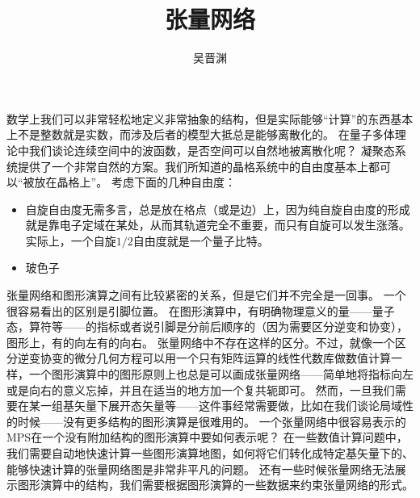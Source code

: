 \documentclass[hyperref, UTF8, a4paper]{ctexart}
\title{张量网络}
\author{吴晋渊}
\begin{document}
\maketitle

数学上我们可以非常轻松地定义非常抽象的结构，但是实际能够“计算”的东西基本上不是整数就是实数，而涉及后者的模型大抵总是能够离散化的。
在量子多体理论中我们谈论连续空间中的波函数，是否空间可以自然地被离散化呢？
凝聚态系统提供了一个非常自然的方案。我们所知道的晶格系统中的自由度基本上都可以“被放在晶格上”。
考虑下面的几种自由度：
\begin{itemize}
    \item 自旋自由度无需多言，总是放在格点（或是边）上，因为纯自旋自由度的形成就是靠电子定域在某处，从而其轨道完全不重要，而只有自旋可以发生涨落。
    实际上，一个自旋$1/2$自由度就是一个量子比特。
    \item 玻色子
\end{itemize}



张量网络和图形演算之间有比较紧密的关系，但是它们并不完全是一回事。
一个很容易看出的区别是引脚位置。
在图形演算中，有明确物理意义的量——量子态，算符等——的指标或者说引脚是分前后顺序的（因为需要区分逆变和协变），图形上，有的向左有的向右。
张量网络中不存在这样的区分。不过，就像一个区分逆变协变的微分几何方程可以用一个只有矩阵运算的线性代数库做数值计算一样，一个图形演算中的图形原则上也总是可以画成张量网络——简单地将指标向左或是向右的意义忘掉，并且在适当的地方加一个复共轭即可。
然而，一旦我们需要在某一组基矢量下展开态矢量等——这件事经常需要做，比如在我们谈论局域性的时候——没有更多结构的图形演算是很难用的。
一个张量网络中很容易表示的MPS在一个没有附加结构的图形演算中要如何表示呢？
在一些数值计算问题中，我们需要自动地快速计算一些图形演算地图，如何将它们转化成特定基矢量下的、能够快速计算的张量网络图是非常非平凡的问题。
还有一些时候张量网络无法展示图形演算中的结构，我们需要根据图形演算的一些数据来约束张量网络的形式。
\end{document}
